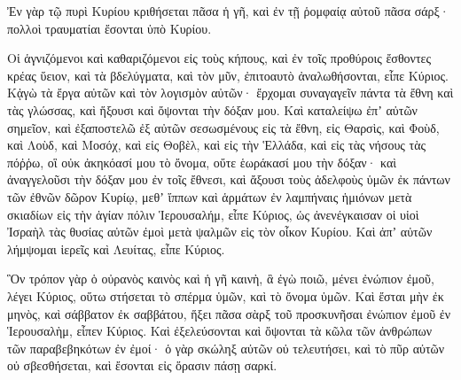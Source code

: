 {Ἐν γὰρ τῷ πυρὶ Κυρίου κριθήσεται πᾶσα ἡ γῆ, καὶ ἐν τῇ ῥομφαίᾳ αὐτοῦ πᾶσα σάρξ· πολλοὶ τραυματίαι ἔσονται ὑπὸ Κυρίου.
\par }{\PP {}Οἱ ἁγνιζόμενοι καὶ καθαριζόμενοι εἰς τοὺς κήπους, καὶ ἐν τοῖς προθύροις ἔσθοντες κρέας ὕειον, καὶ τὰ βδελύγματα, καὶ τὸν μῦν, ἐπιτοαυτὸ ἀναλωθήσονται, εἶπε Κύριος.
Κᾀγὼ τὰ ἔργα αὐτῶν καὶ τὸν λογισμὸν αὐτῶν· ἔρχομαι συναγαγεῖν πάντα τὰ ἔθνη καὶ τὰς γλώσσας, καὶ ἥξουσι καὶ ὄψονται τὴν δόξαν μου.
Καὶ καταλείψω ἐπʼ αὐτῶν σημεῖον, καὶ ἐξαποστελῶ ἐξ αὐτῶν σεσωσμένους εἰς τὰ ἔθνη, εἰς Θαρσὶς, καὶ Φοὺδ, καὶ Λοὺδ, καὶ Μοσόχ, καὶ εἰς Θοβὲλ, καὶ εἰς τὴν Ἑλλάδα, καὶ εἰς τὰς νήσους τὰς πόῤῥω, οἳ οὐκ ἀκηκόασί μου τὸ ὄνομα, οὔτε ἑωράκασί μου τὴν δόξαν· καὶ ἀναγγελοῦσι τὴν δόξαν μου ἐν τοῖς ἔθνεσι,
καὶ ἄξουσι τοὺς ἀδελφοὺς ὑμῶν ἐκ πάντων τῶν ἐθνῶν δῶρον Κυρίῳ, μεθʼ ἵππων καὶ ἁρμάτων ἐν λαμπήναις ἡμιόνων μετὰ σκιαδίων εἰς τὴν ἁγίαν πόλιν Ἱερουσαλήμ, εἶπε Κύριος, ὡς ἀνενέγκαισαν οἱ υἱοὶ Ἰσραὴλ τὰς θυσίας αὐτῶν ἐμοὶ μετὰ ψαλμῶν εἰς τὸν οἶκον Κυρίου.
Καὶ ἀπʼ αὐτῶν λήμψομαι ἱερεῖς καὶ Λευίτας, εἶπε Κύριος.
\par }{\PP {}Ὃν τρόπον γὰρ ὁ οὐρανὸς καινὸς καὶ ἡ γῆ καινὴ, ἃ ἐγὼ ποιῶ, μένει ἐνώπιον ἐμοῦ, λέγει Κύριος, οὕτω στήσεται τὸ σπέρμα ὑμῶν, καὶ τὸ ὄνομα ὑμῶν.
Καὶ ἔσται μὴν ἐκ μηνὸς, καὶ σάββατον ἐκ σαββάτου, ἥξει πᾶσα σὰρξ τοῦ προσκυνῆσαι ἐνώπιον ἐμοῦ ἐν Ἱερουσαλὴμ, εἶπεν Κύριος.
Καὶ ἐξελεύσονται καὶ ὄψονται τὰ κῶλα τῶν ἀνθρώπων τῶν παραβεβηκότων ἐν ἐμοί· ὁ γὰρ σκώληξ αὐτῶν οὐ τελευτήσει, καὶ τὸ πῦρ αὐτῶν οὐ σβεσθήσεται, καὶ ἔσονται εἰς ὅρασιν πάσῃ σαρκί.
\par }